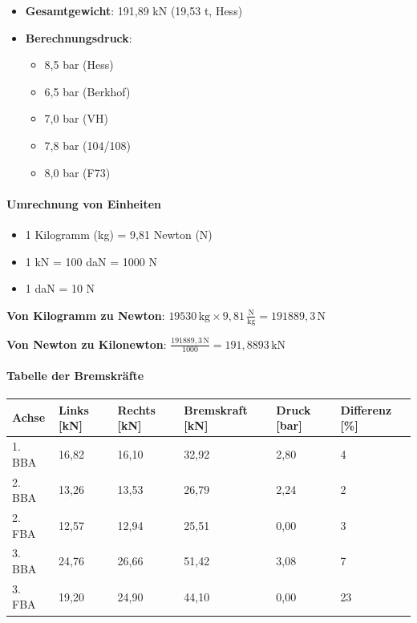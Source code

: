 \documentclass{vorlage-design-main}
\begin{document}
\begin{itemize}

\item
  \textbf{Gesamtgewicht}: 191,89 kN (19,53 t, Hess)
\item
  \textbf{Berechnungsdruck}:

  \begin{itemize}
  
  \item
    8,5 bar (Hess)
  \item
    6,5 bar (Berkhof)
  \item
    7,0 bar (VH)
  \item
    7,8 bar (104/108)
  \item
    8,0 bar (F73)
  \end{itemize}
\end{itemize}

\paragraph{Umrechnung von Einheiten}\label{umrechnung-von-einheiten}

\begin{itemize}

\item
  1 Kilogramm (kg) = 9,81 Newton (N)
\item
  1 kN = 100 daN = 1000 N
\item
  1 daN = 10 N
\end{itemize}

\textbf{Von Kilogramm zu Newton}:
$19530 \, \text{kg} \times 9,81 \, \frac{\text{N}}{\text{kg}} = 191889,3 \, \text{N}$

\textbf{Von Newton zu Kilonewton}:
$\frac{191889,3 \, \text{N}}{1000} = 191,8893 \, \text{kN}$

\paragraph{Tabelle der Bremskräfte}\label{tabelle-der-bremskraefte}

\begin{table}[ht]
  \begin{tabular}{@{}llllll@{}}
\toprule
Achse
 & 
Links {[}kN{]}
 & 
Rechts {[}kN{]}
 & 
Bremskraft {[}kN{]}
 & 
Druck {[}bar{]}
 & 
Differenz {[}\%{]}
 \\
\midrule[\heavyrulewidth]
1. BBA & 16,82 & 16,10 & 32,92 & 2,80 & 4 \\
2. BBA & 13,26 & 13,53 & 26,79 & 2,24 & 2 \\
2. FBA & 12,57 & 12,94 & 25,51 & 0,00 & 3 \\
3. BBA & 24,76 & 26,66 & 51,42 & 3,08 & 7 \\
3. FBA & 19,20 & 24,90 & 44,10 & 0,00 & 23 \\
\bottomrule
\end{tabular}%
\end{table}
\end{document}
